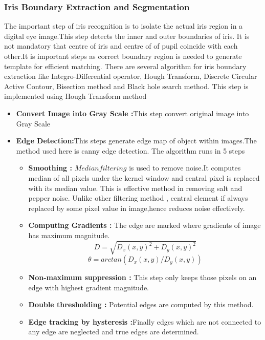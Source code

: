\documentclass[conference]{Iris_detect}
\begin{document}
\subsubsection{Iris Boundary Extraction and Segmentation}
The important step of iris recognition is to isolate the actual iris region in a digital eye image.This step detects the inner and outer boundaries of iris.\cite{iris} It is not mandatory that centre of iris and centre of of pupil coincide with each other.It is important steps as correct boundary region  is needed to generate template for efficient matching. There are several algorithm for iris boundary extraction like Integro-Differential operator, Hough Transform, Discrete Circular Active Contour, Bisection method and Black hole search method. This step is implemented using Hough Transform method
\begin{itemize}
    \item \textbf{Convert Image into Gray Scale :}This step convert original image into Gray Scale
    \item \textbf{Edge Detection:}This steps generate edge map of object within images.The method used here is canny edge detection.
    The algorithm runs in 5 steps
    \begin{itemize}
    \item \textbf{Smoothing : }$Median filtering$ is used to remove noise.It computes median of all pixels under the kernel window and central pixel is replaced with its median value. This is effective method in removing salt and pepper noise. Unlike other filtering method , central element if always replaced by some pixel value in image,hence reduces noise effectively.
    \item \textbf{Computing Gradients :} The edge are marked where gradients of image has maximum magnitude.
    \begin{equation}
    D=\sqrt{D_{x}(x,y)^2 +D_{y}(x,y)^2}
    \end{equation}
    \begin{equation}
    \theta = arctan(D_{x}(x,y)/D_{y}(x,y))
    \end{equation}
    \item \textbf{Non-maximum suppression : } This step only keeps those pixels on an edge with highest gradient magnitude.
    \item \textbf{Double thresholding :} Potential edges are computed by this method.
    \item \textbf{Edge tracking by hysteresis :}Finally edges which are not connected to any edge are neglected and true edges are determined.
    \end{itemize}
    

\end{itemize}
\end{document}

